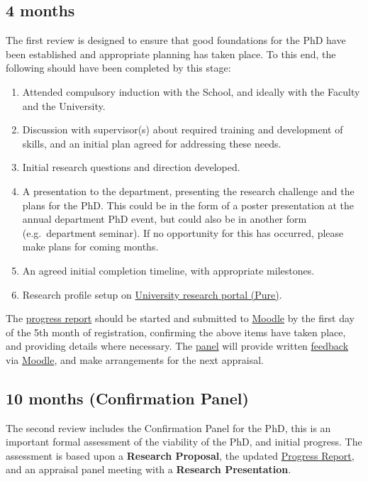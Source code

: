 \documentclass[12pt,a4paper]{article}
\begin{document}
\subsection{4 months} \label{sec:4months}
The first review is designed to ensure that good foundations for the PhD have been established and appropriate planning has taken place. To this end, the following should have been completed by this stage:
\begin{enumerate}
\item Attended compulsory induction with the School, and ideally with the Faculty and the University.
\item Discussion with supervisor(s) about required training and development of skills, and an initial plan agreed for addressing these needs.
\item Initial research questions and direction developed.
\item A presentation to the department, presenting the research challenge and the plans for the PhD. This could be in the form of a poster presentation at the annual department PhD event, but could also be in another form (e.g.\ department seminar). If no opportunity for this has occurred, please make plans for coming months.
\item An agreed initial completion timeline, with appropriate milestones.
\item Research profile setup on \href{https://pure.lancs.ac.uk}{University research portal (Pure)}.
\end{enumerate}

The \hyperref[sec:report]{progress report} should be started and submitted to \href{https://modules.lancaster.ac.uk/course/view.php?id=7050}{Moodle} by the first day of the 5th month of registration, confirming the above items have taken place, and providing details where necessary. The \hyperref[sec:panel]{panel} will provide written \hyperref[sec:feedback]{feedback} via \href{https://modules.lancaster.ac.uk/course/view.php?id=7050}{Moodle}, and make arrangements for the next appraisal.


\subsection{10 months (Confirmation Panel)} \label{sec:10months}
The second review includes the Confirmation Panel for the PhD, this is an important formal assessment of the viability of the PhD, and initial progress. The assessment is based upon a \textbf{Research Proposal}, the updated \hyperref[sec:report]{Progress Report}, and an appraisal panel meeting with a \textbf{Research Presentation}.
\end{document}
